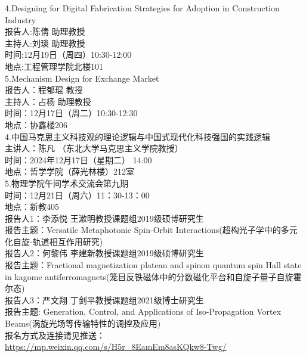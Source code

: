 \documentclass[letterpaper, 12pt]{article}
\begin{document}
\begin{multicols}{2}
4.Designing for Digital Fabrication Strategies for Adoption in Construction Industry\\
报告人:陈倩 助理教授\\
主持人:刘琰 助理教授\\
时间:12月19日（周四）10:30-12:00\\
地点:工程管理学院北楼101\\

5.Mechanism Design for Exchange Market\\
报告人：程郁琨 教授\\
主持人：占杨 助理教授\\
时间：12月17日（周二）10:30-12:30\\
地点：协鑫楼206\\

4.中国马克思主义科技观的理论逻辑与中国式现代化科技强国的实践逻辑\\
主讲人：陈凡 （东北大学马克思主义学院教授）\\
时间：2024年12月17日（星期二） 14:00\\
地点：哲学学院（薛光林楼）212室\\

5.物理学院午间学术交流会第九期\\
时间：12月21日（周六）11：30-13：00\\
地点：新教405\\
报告人1：李添悦 王漱明教授课题组2019级硕博研究生\\
报告主题：Versatile Metaphotonic Spin-Orbit Interactions(超构光子学中的多元化自旋-轨道相互作用研究)\\
报告人2：何黎伟 李建新教授课题组2019级硕博研究生\\
报告主题：Fractional magnetization plateau and spinon quantum spin Hall state in kagome antiferromagnets(笼目反铁磁体中的分数磁化平台和自旋子量子自旋霍尔态)\\
报告人3：严文翔 丁剑平教授课题组2021级博士研究生\\
报告主题: Generation, Control, and Applications of Iso-Propagation Vortex Beams(涡旋光场等传输特性的调控及应用)\\
报名方式及连接请见推送：\url{https://mp.weixin.qq.com/s/H5r_8EamEm8asKQkw8-Twg/}\\



\end{multicols}
\end{document}
